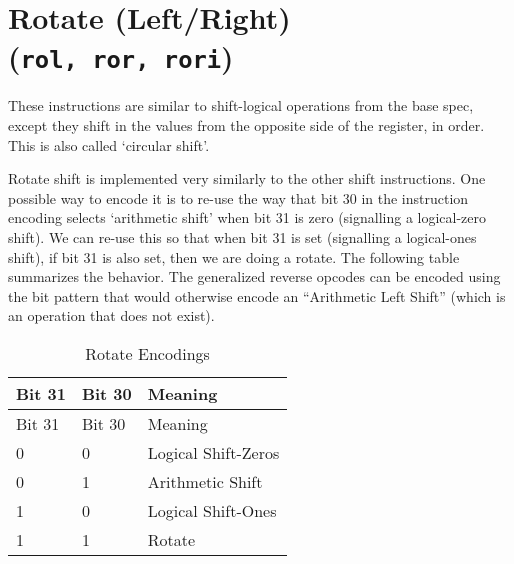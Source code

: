 
\section{Rotate (Left/Right) (\texttt{rol,\ ror,\ rori})}

These instructions are similar to shift-logical operations from the base
spec, except they shift in the values from the opposite side of the
register, in order. This is also called `circular shift'.





Rotate shift is implemented very similarly to the other shift
instructions. One possible way to encode it is to re-use the way that
bit 30 in the instruction encoding selects `arithmetic shift' when bit
31 is zero (signalling a logical-zero shift). We can re-use this so that
when bit 31 is set (signalling a logical-ones shift), if bit 31 is also
set, then we are doing a rotate. The following table summarizes the
behavior. The generalized reverse opcodes can be encoded using the
bit pattern that would otherwise encode an ``Arithmetic Left Shift''
(which is an operation that does not exist).

\begin{longtable}[c]{@{}lll@{}}
\caption{Rotate Encodings}\tabularnewline
\toprule
Bit 31 & Bit 30 & Meaning\tabularnewline
\midrule
\endfirsthead
\toprule
Bit 31 & Bit 30 & Meaning\tabularnewline
\midrule
\endhead
0 & 0 & Logical Shift-Zeros\tabularnewline
0 & 1 & Arithmetic Shift\tabularnewline
1 & 0 & Logical Shift-Ones\tabularnewline
1 & 1 & Rotate\tabularnewline
\bottomrule
\end{longtable}

%
%
%
%
%

